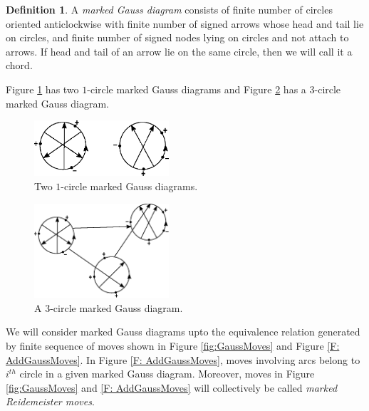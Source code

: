 \documentclass[11 pt, reqno]{amsart}
\theoremstyle{definition}
\newtheorem{definition}[theorem]{Definition}
\numberwithin{equation}{subsection}
\begin{document}
\begin{definition}
A \textit{marked Gauss diagram} consists of finite number of circles oriented anticlockwise with finite number of signed arrows whose head and tail lie on circles, and finite number of signed nodes lying on circles and not attach to arrows. If head and tail of an arrow lie on the same circle, then we will call it a chord.
\end{definition}

Figure \ref{F: Example-1} has two $1$-circle marked Gauss diagrams and Figure \ref{F: Example-2} has a $3$-circle marked Gauss diagram.

\begin{figure}[H]
\includegraphics[width=5cm]{example-1.eps}
    \caption{Two $1$-circle marked Gauss diagrams.}
    \label{F: Example-1}
\end{figure}


\begin{figure}[H]
\includegraphics[width=5cm]{example-2.eps}
    \caption{A $3$-circle marked Gauss diagram.}
    \label{F: Example-2}
\end{figure}

We will consider marked Gauss diagrams upto the equivalence relation generated by finite sequence of moves shown in Figure \ref{fig:GaussMoves} and Figure \ref{F: AddGaussMoves}. In Figure \ref{F: AddGaussMoves}, moves involving arcs belong to $i^{th}$ circle in a given marked Gauss diagram. Moreover, moves in Figure \ref{fig:GaussMoves} and \ref{F: AddGaussMoves} will collectively be called \textit{marked Reidemeister moves}. 
\end{document}
